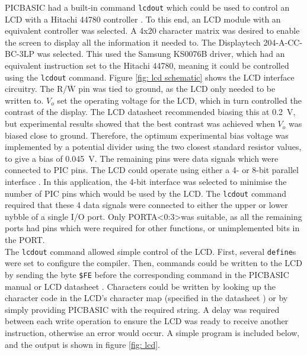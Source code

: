 PICBASIC had a built-in command \verb|lcdout| which could be used to control an LCD with a Hitachi 44780 controller \cite{picbasic_pro}. To this end, an LCD module with an equivalent controller was selected. A 4x20 character matrix was desired to enable the screen to display all the information it needed to. The Displaytech 204-A-CC-BC-3LP \cite{lcd} was selected. This used the Samsung KS0076B driver, which had an equivalent instruction set to the Hitachi 44780, meaning it could be controlled using the \verb|lcdout| command. Figure \ref{fig: lcd schematic} shows the LCD interface circuitry. The R/$\overline{\text{W}}$ pin was tied to ground, as the LCD only needed to be written to. $V_o$ set the operating voltage for the LCD, which in turn controlled the contrast of the display. The LCD datasheet recommended biasing this at \SI{0.2}{\volt}, but experimental results showed that the best contrast was achieved when $V_o$ was biased close to ground. Therefore, the optimum experimental bias voltage was implemented by a potential divider using the two closest standard resistor values, to give a bias of \SI{0.045}{\volt}. The remaining pins were data signals which were connected to PIC pins. The LCD could operate using either a 4- or 8-bit parallel interface \cite{picbasic_pro}. In this application, the 4-bit interface was selected to minimise the number of PIC pins which would be used by the LCD. The \verb|lcdout| command required that these 4 data signals were connected to either the upper or lower nybble of a single I/O port. Only PORTA\textless0:3\textgreater was suitable, as all the remaining ports had pins which were required for other functions, or unimplemented bits in the PORT.\\

The \verb|lcdout| command allowed simple control of the LCD. First, several \verb|define|s were set to configure the compiler. Then, commands could be written to the LCD by sending the byte \verb|$FE| before the corresponding command in the PICBASIC manual \cite{picbasic_pro} or LCD datasheet \cite{lcd}. Characters could be written by looking up the character code in the LCD's character map (specified in the datasheet \cite{lcd}) or by simply providing PICBASIC with the required string. A delay was required between each write operation to ensure the LCD was ready to receive another instruction, otherwise an error would occur. A simple program is included below, and the output is shown in figure \ref{fig: lcd}.

